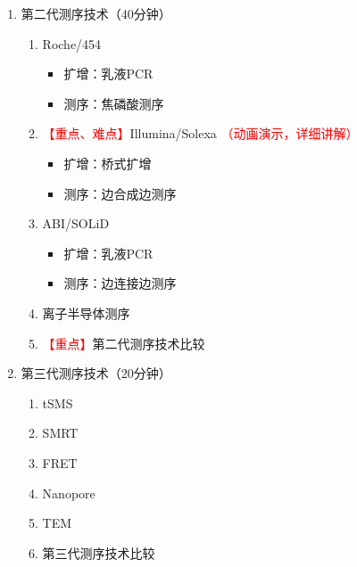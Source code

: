 \documentclass{TIJMUjiaoanLL}
\begin{document}
\begin{enumerate}
  \item 第二代测序技术（40分钟）
    \begin{enumerate}
      \item Roche/454
        \begin{itemize}
          \item 扩增：乳液PCR
          \item 测序：焦磷酸测序
        \end{itemize}
      \item \textcolor{red}{【重点、难点】}Illumina/Solexa \textcolor{red}{（动画演示，详细讲解）}
        \begin{itemize}
          \item 扩增：桥式扩增
          \item 测序：边合成边测序
        \end{itemize}
      \item ABI/SOLiD
        \begin{itemize}
          \item 扩增：乳液PCR
          \item 测序：边连接边测序
        \end{itemize}
      \item 离子半导体测序
      \item \textcolor{red}{【重点】}第二代测序技术比较
    \end{enumerate}
\vspace{8em}
\vspace{0.1em}

\otherTail
\newpage
\otherHeader

\vspace{0.1em}
  \item 第三代测序技术（20分钟）
    \begin{enumerate}
      \item tSMS
      \item SMRT
      \item FRET
      \item Nanopore
      \item TEM
      \item 第三代测序技术比较
    \end{enumerate}


\end{enumerate}
\end{document}

